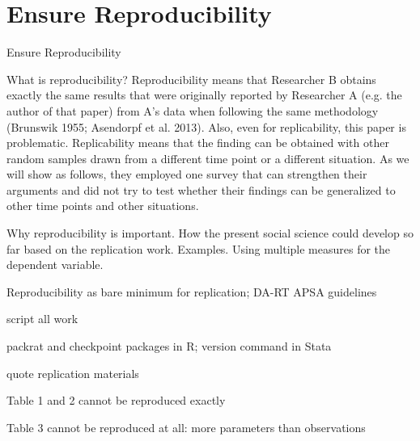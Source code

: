 
\section{Ensure Reproducibility}

Ensure Reproducibility

What is reproducibility? Reproducibility means that Researcher B obtains exactly the same results that were originally reported by Researcher A (e.g. the author of that paper) from A’s data when following the same methodology (Brunswik 1955; Asendorpf et al. 2013). 
Also, even for replicability, this paper is problematic. Replicability means that the finding can be obtained with other random samples drawn from a different time point or a different situation. As we will show as follows, they employed one survey that can strengthen their arguments and did not try to test whether their findings can be generalized to other time points and other situations. 

Why reproducibility is important.
How the present social science could develop so far based on the replication work. Examples.
Using multiple measures for the dependent variable. 

Reproducibility as bare minimum for replication; DA-RT APSA guidelines

script all work

packrat and checkpoint packages in R; version command in Stata

quote \citet{Newman2015} replication materials

Table 1 and 2 cannot be reproduced exactly

Table 3 cannot be reproduced at all: more parameters than observations

